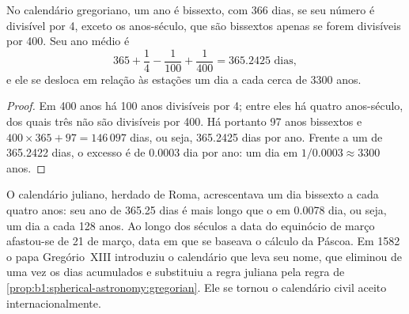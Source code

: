 \begin{proposition}\label{prop:b1:spherical-astronomy:gregorian}
No calendário gregoriano, um ano é bissexto, com 366 dias, se seu número é divisível por 4, exceto os anos-século, que são bissextos apenas se forem divisíveis por 400. Seu ano médio é
\[
  365 + \frac14 - \frac1{100} + \frac1{400} = \num{365.2425}\text{ dias},
\]
e ele se desloca em relação às estações um dia a cada cerca de 3300 anos.
\end{proposition}

\begin{proof}
Em 400 anos há 100 anos divisíveis por 4; entre eles há quatro anos-século, dos quais três não são divisíveis por 400. Há portanto 97 anos bissextos e $400\times 365 + 97 = 146\,097$ dias, ou seja, 365.2425 dias por ano. Frente a um  de 365.2422 dias, o excesso é de 0.0003 dia por ano: um dia em $1/0.0003 \approx 3300$ anos.
\end{proof}

\begin{history}[A reforma de 1582]
O calendário juliano, herdado de Roma, acrescentava um dia bissexto a cada quatro anos: seu ano de 365.25 dias é mais longo que o  em 0.0078 dia, ou seja, um dia a cada 128 anos. Ao longo dos séculos a data do equinócio de março afastou-se de 21 de março, data em que se baseava o cálculo da Páscoa. Em 1582 o papa Gregório~XIII introduziu o calendário que leva seu nome, que eliminou de uma vez os dias acumulados e substituiu a regra juliana pela regra de \cref{prop:b1:spherical-astronomy:gregorian}. Ele se tornou o calendário civil aceito internacionalmente.
\end{history}

